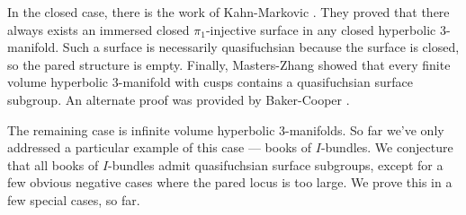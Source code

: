 \documentclass[12pt]{amsart}
\theoremstyle{definition}
\theoremstyle{remark}
\begin{document}

In the closed case, there is the work of Kahn-Markovic \cite{KM}. They proved
that there always exists an immersed closed $\pi_1$-injective surface in any
closed hyperbolic 3-manifold.  Such a surface is necessarily quasifuchsian
because the surface is closed, so the pared structure is empty. Finally,
Masters-Zhang \cite{MZ} showed that every finite volume hyperbolic 3-manifold
with cusps contains a quasifuchsian surface subgroup. An alternate proof was
provided by Baker-Cooper \cite{BC}.

The remaining case is infinite volume hyperbolic 3-manifolds. So far we've only
addressed a particular example of this case --- books of $I$-bundles. We
conjecture that all books of $I$-bundles admit quasifuchsian surface subgroups,
except for a few obvious negative cases where the pared locus is too large. We
prove this in a few special cases, so far.

\end{document}
